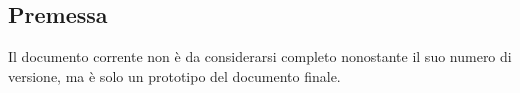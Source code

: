 \subsection{Premessa}
Il documento corrente non è da considerarsi completo nonostante il suo numero di versione,
ma è solo un prototipo del documento finale.

